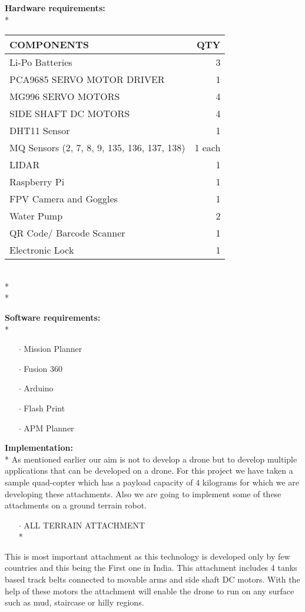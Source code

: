 \documentclass[12pt]{article}
\begin{document}
\textbf{Hardware requirements:}\\*

\begin{tabular}{||l|r||}
\hline
COMPONENTS &  QTY \\
\hline
Li-Po Batteries &  3 \\
PCA9685 SERVO MOTOR DRIVER &  1 \\
MG996 SERVO MOTORS &  4 \\
SIDE SHAFT DC MOTORS &  4 \\
DHT11 Sensor &  1\\
MQ Sensors (2, 7, 8, 9, 135, 136, 137, 138) &  1 each \\
LIDAR &  1 \\	
Raspberry Pi &  1 \\
FPV Camera and Goggles &  1 \\
Water Pump &  2 \\
QR Code/ Barcode Scanner  &  1 \\
Electronic Lock &  1 \\
\hline
\end{tabular}\\* \\*

\textbf{Software requirements:}\\*
\begin{itemize}
\item[$\cdot$] Mission Planner
\item[$\cdot$] Fusion 360
\item[$\cdot$] Arduino
\item[$\cdot$] Flash Print
\item[$\cdot$] APM Planner
\end{itemize}

\textbf{Implementation:}\\*
As mentioned earlier our aim is not to develop a drone but to develop multiple applications that can be developed on a drone. For this project we have taken a sample quad-copter which has a payload capacity of 4 kilograms for which we are developing these attachments. Also we are going to implement some of these attachments on a ground terrain robot. 

\begin{itemize}
\item[$\cdot$] ALL TERRAIN ATTACHMENT \\*
\end{itemize}
This is most important attachment as this technology is developed only by few countries and this being the First one in India. This attachment includes 4 tanks based track belts connected to movable arms and side shaft DC motors. With the help of these motors the attachment will enable the drone to run on any surface such as mud, staircase or hilly regions.
\end{document}
